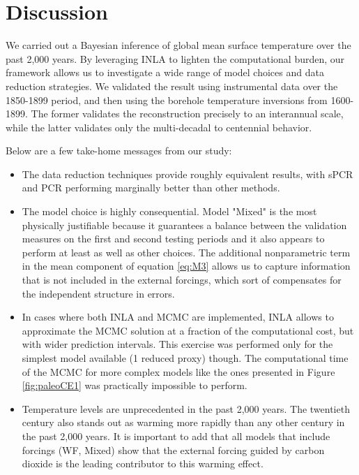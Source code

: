 \documentclass[12pt]{amsart}
\theoremstyle{plain}
\theoremstyle{definition}
\theoremstyle{remark}
\begin{document}
\section{Discussion}
We carried out a Bayesian inference of global mean surface temperature over
the past 2,000 years. By leveraging INLA to lighten the computational burden, our framework allows us to investigate a wide range of model choices and data reduction strategies.  We validated the result using instrumental data over the 1850-1899 period, and then using the borehole temperature inversions from 1600-1899. The former validates the reconstruction precisely to an interannual scale, while the latter validates only the multi-decadal to centennial behavior.  

Below are a few take-home messages from our study:

\begin{itemize}
    \item The data reduction techniques provide roughly equivalent results, with
      sPCR and PCR performing marginally better than other methods.
    \item The model choice is highly consequential. Model "Mixed" is the most
      physically justifiable because it guarantees a balance between the
      validation measures on the first and second testing periods and it also
      appears to perform at least as well as other choices. The 
      additional nonparametric term in the mean component of equation \eqref{eq:M3} allows us
      to capture information that is not included in the external forcings, which sort of compensates for the independent structure in errors. 
    \item In cases where both INLA and MCMC are implemented, INLA allows to approximate the MCMC
      solution at a fraction of the computational cost, but with wider
      prediction intervals. This exercise was performed only for the simplest
      model available (1 reduced proxy) though. The computational time of the
      MCMC for more complex models like the ones presented in Figure
      \ref{fig:paleoCE1} was practically impossible to perform. 
    \item Temperature levels are unprecedented in the past 2,000 years. 
      The twentieth century also stands out as warming more rapidly than any other
      century in the past 2,000 years. It is important to add that all models that include forcings (WF, Mixed) show that the external
      forcing guided by carbon dioxide is the leading contributor to this
      warming effect. 
\end{itemize}
\end{document}
